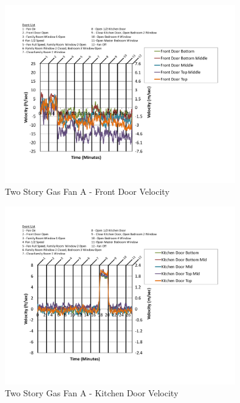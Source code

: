 \documentclass{article}
\begin{document}
\begin{appendices}
	\begin{figure}[H]
		\centering
		\includegraphics[height=3.05in,trim=0.67in 1.1in 0.67in 0.8in,clip=true]{0_Images/Results_Charts/ColdFlow/Two_Story/Gas/A/Front_Door_Velocity.pdf}
		\caption{Two Story Gas Fan A - Front Door Velocity}
	\end{figure}
 

	\begin{figure}[H]
		\centering
		\includegraphics[height=3.05in,trim=0.67in 1.1in 0.67in 0.8in,clip=true]{0_Images/Results_Charts/ColdFlow/Two_Story/Gas/A/Kitchen_Door_Velocity.pdf}
		\caption{Two Story Gas Fan A - Kitchen Door Velocity}
	\end{figure}
 
	\clearpage


\end{appendices}
\end{document}
